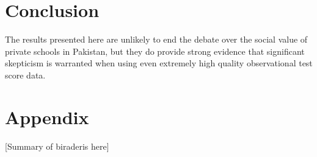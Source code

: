 \documentclass[12pt]{article}
\begin{document}



\section{Conclusion}\label{conclusion}
The results presented here are unlikely to end the debate over the social value of private schools in Pakistan, but they do provide strong evidence that significant skepticism is warranted when using even extremely high quality observational test score data.

\pagebreak

	
	

\pagebreak

\appendix


\section{Appendix}\label{biraderis}

[Summary of biraderis here]
\end{document}
